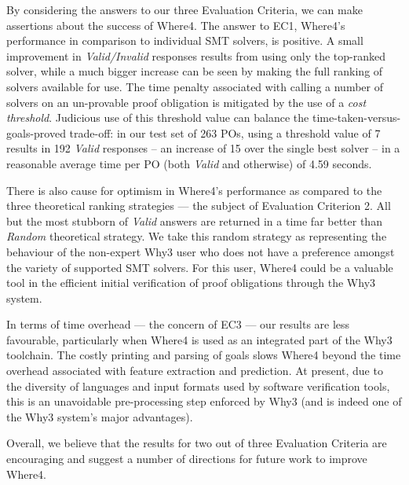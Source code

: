 \documentclass[submission,copyright,creativecommons]{eptcs}
\begin{document}
By considering the answers to our three Evaluation Criteria, we can make assertions about the success of \textsf{Where4}.
The answer to EC1, \textsf{Where4}'s performance in comparison to individual SMT solvers, is positive.
A small improvement in \textit{Valid/Invalid} responses results from using only the top-ranked solver, while a much bigger increase can be seen by making the full ranking of solvers available for use.
The time penalty associated with calling a number of solvers on an un-provable proof obligation is mitigated by the use of a \textit{cost threshold}.
Judicious use of this threshold value can balance the time-taken-versus-goals-proved trade-off: in our test set of 263 POs, using a threshold value of 7 results in 192 \textit{Valid} responses -- an increase of 15 over the single best solver -- in a reasonable average time per PO (both \textit{Valid} and otherwise) of 4.59 seconds.

There is also cause for optimism in \textsf{Where4}'s performance as compared to the three theoretical ranking strategies --- the subject of Evaluation Criterion 2. 
All but the most stubborn of \textit{Valid} answers are returned in a time far better than \textit{Random} theoretical strategy.
We take this random strategy as representing the behaviour of the non-expert \textsf{Why3} user who does not have a preference amongst the variety of supported SMT solvers.
For this user, \textsf{Where4} could be a valuable tool in the efficient initial verification of proof obligations through the \textsf{Why3} system.    

In terms of time overhead --- the concern of EC3 --- our results are less favourable, particularly when \textsf{Where4} is used as an integrated part of the \textsf{Why3} toolchain.
The costly printing and parsing of goals slows \textsf{Where4} beyond the time overhead associated with feature extraction and prediction.
At present, due to the diversity of languages and input formats used by software verification tools, this is an unavoidable pre-processing step enforced by \textsf{Why3} (and is indeed one of the \textsf{Why3} system's major advantages).

Overall, we believe that the results for two out of three Evaluation Criteria are encouraging and suggest a number of directions for future work to improve \textsf{Where4}.
\end{document}
